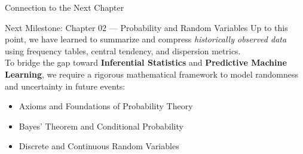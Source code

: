 \documentclass[aspectratio=169,xcolor={dvipsnames,table}]{beamer}
\begin{document}
\begin{frame}{Connection to the Next Chapter}
  \begin{alertblock}{Next Milestone: Chapter 02 — Probability and Random Variables}
    Up to this point, we have learned to summarize and compress \emph{historically observed data} using frequency tables, central tendency, and dispersion metrics.
    \vspace{0.6em}
    \\ To bridge the gap toward \textbf{Inferential Statistics} and \textbf{Predictive Machine Learning}, we require a rigorous mathematical framework to model randomness and uncertainty in future events:
    \begin{itemize}
      \item Axioms and Foundations of Probability Theory
      \item Bayes' Theorem and Conditional Probability
      \item Discrete and Continuous Random Variables
    \end{itemize}
  \end{alertblock}
\end{frame}
\end{document}
